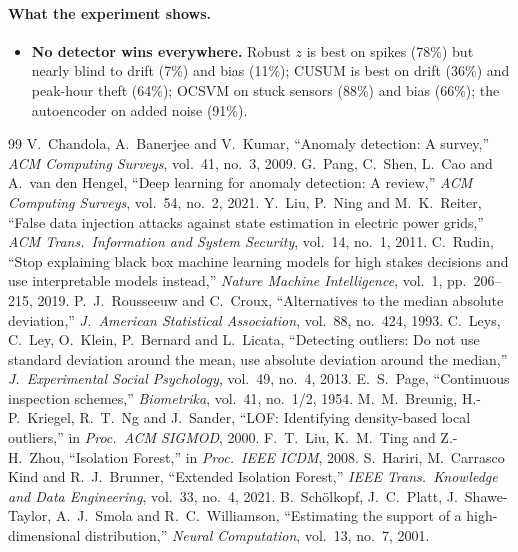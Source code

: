 \documentclass[11pt,a4paper]{article}
\begin{document}
\paragraph{What the experiment shows.}
\begin{itemize}[leftmargin=*,itemsep=2pt]
  \item \textbf{No detector wins everywhere.} Robust $z$ is best on spikes (78\%) but nearly blind to drift
        (7\%) and bias (11\%); CUSUM is best on drift (36\%) and peak-hour theft (64\%); OCSVM on stuck
        sensors (88\%) and bias (66\%); the autoencoder on added noise (91\%).
\end{itemize}

\begin{thebibliography}{99}
 V.~Chandola, A.~Banerjee and V.~Kumar, ``Anomaly detection: A survey,'' \emph{ACM Computing Surveys}, vol.~41, no.~3, 2009.
 G.~Pang, C.~Shen, L.~Cao and A.~van den Hengel, ``Deep learning for anomaly detection: A review,'' \emph{ACM Computing Surveys}, vol.~54, no.~2, 2021.
 Y.~Liu, P.~Ning and M.~K.~Reiter, ``False data injection attacks against state estimation in electric power grids,'' \emph{ACM Trans.\ Information and System Security}, vol.~14, no.~1, 2011.
 C.~Rudin, ``Stop explaining black box machine learning models for high stakes decisions and use interpretable models instead,'' \emph{Nature Machine Intelligence}, vol.~1, pp.~206--215, 2019.
 P.~J.~Rousseeuw and C.~Croux, ``Alternatives to the median absolute deviation,'' \emph{J.\ American Statistical Association}, vol.~88, no.~424, 1993.
 C.~Leys, C.~Ley, O.~Klein, P.~Bernard and L.~Licata, ``Detecting outliers: Do not use standard deviation around the mean, use absolute deviation around the median,'' \emph{J.\ Experimental Social Psychology}, vol.~49, no.~4, 2013.
 E.~S.~Page, ``Continuous inspection schemes,'' \emph{Biometrika}, vol.~41, no.~1/2, 1954.
 M.~M.~Breunig, H.-P.~Kriegel, R.~T.~Ng and J.~Sander, ``LOF: Identifying density-based local outliers,'' in \emph{Proc.\ ACM SIGMOD}, 2000.
 F.~T.~Liu, K.~M.~Ting and Z.-H.~Zhou, ``Isolation Forest,'' in \emph{Proc.\ IEEE ICDM}, 2008.
 S.~Hariri, M.~Carrasco Kind and R.~J.~Brunner, ``Extended Isolation Forest,'' \emph{IEEE Trans.\ Knowledge and Data Engineering}, vol.~33, no.~4, 2021.
 B.~Schölkopf, J.~C.~Platt, J.~Shawe-Taylor, A.~J.~Smola and R.~C.~Williamson, ``Estimating the support of a high-dimensional distribution,'' \emph{Neural Computation}, vol.~13, no.~7, 2001.

\end{thebibliography}
\end{document}

